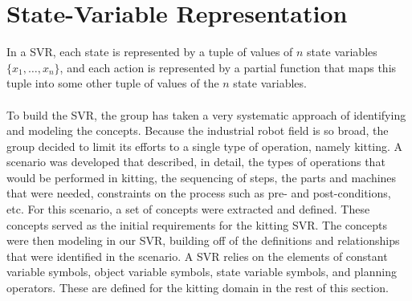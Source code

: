 \section{State-Variable Representation}
In a SVR, each state is represented by a tuple of values of $n$ state variables $\lbrace x_1,\dots,x_n\rbrace$, and each action is represented by a partial function that maps this tuple into some other tuple of values of the $n$ state variables.\\ \\
To build the SVR, the group has taken a very systematic approach of identifying and modeling the concepts. Because the industrial robot field is so broad, the group decided to limit its efforts to a single type of operation, namely kitting. A scenario was developed that described, in detail, the types of operations that would be performed in kitting, the sequencing of steps, the parts and machines that were needed, constraints on the process such as pre- and post-conditions, etc. For this scenario, a set of concepts were extracted and defined. These concepts served as the initial requirements for the kitting SVR. The concepts were then modeling in our SVR, building off of the definitions and relationships that were identified in the scenario. A SVR relies on the elements of constant variable symbols, object variable symbols, state variable symbols, and planning operators. These are defined for the kitting domain in the rest of this section.


